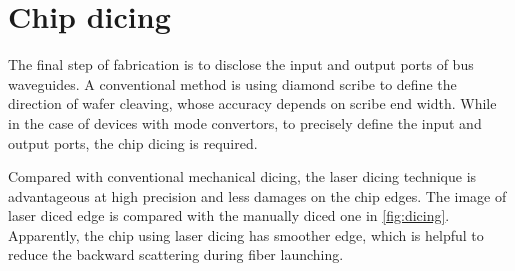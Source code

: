 \begin{figure}
\begin{subfigure}[b]{0.45\textwidth}
    \caption{}
    \end{subfigure}
    \label{fig:anneal}
\end{figure}

\section{Chip dicing}\label{sec:chip-dicing}

The final step of fabrication is to disclose the input and output ports of bus waveguides.
A conventional method is using diamond scribe to define the direction of wafer cleaving, whose accuracy depends on scribe end width.
While in the case of devices with mode convertors, 
to precisely define the input and output ports, the chip dicing is required.

Compared with conventional mechanical dicing,  the laser dicing technique is advantageous at high precision and less damages on the chip edges. The image of laser diced edge is compared with the manually diced one in \autoref{fig:dicing}. Apparently, the chip using laser dicing has smoother edge, which is helpful to reduce the backward scattering during fiber launching.

